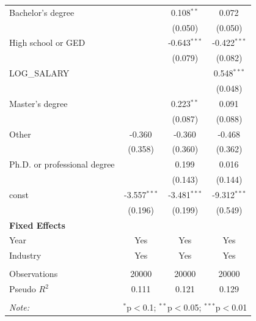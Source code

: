 \begin{table}[!htbp]
\begin{tabular}{@{\extracolsep{5pt}}lccc}
 Bachelor's degree & & 0.108$^{**}$ & 0.072$^{}$ \\
& & (0.050) & (0.050) \\
 High school or GED & & -0.643$^{***}$ & -0.422$^{***}$ \\
& & (0.079) & (0.082) \\
 LOG_SALARY & & & 0.548$^{***}$ \\
& & & (0.048) \\
 Master's degree & & 0.223$^{**}$ & 0.091$^{}$ \\
& & (0.087) & (0.088) \\
 Other & -0.360$^{}$ & -0.360$^{}$ & -0.468$^{}$ \\
& (0.358) & (0.360) & (0.362) \\
 Ph.D. or professional degree & & 0.199$^{}$ & 0.016$^{}$ \\
& & (0.143) & (0.144) \\
 const & -3.557$^{***}$ & -3.481$^{***}$ & -9.312$^{***}$ \\
& (0.196) & (0.199) & (0.549) \\
 \textbf{Fixed Effects} &  &  &  \\
 Year & Yes & Yes & Yes \\
 Industry & Yes & Yes & Yes \\
\hline \\[-1.8ex]
 Observations & 20000 & 20000 & 20000 \\
 Pseudo $R^2$ & 0.111 & 0.121 & 0.129 \\
\hline
\hline \\[-1.8ex]
\textit{Note:} & \multicolumn{3}{r}{$^{*}$p$<$0.1; $^{**}$p$<$0.05; $^{***}$p$<$0.01} \\
\end{tabular}
\end{table}